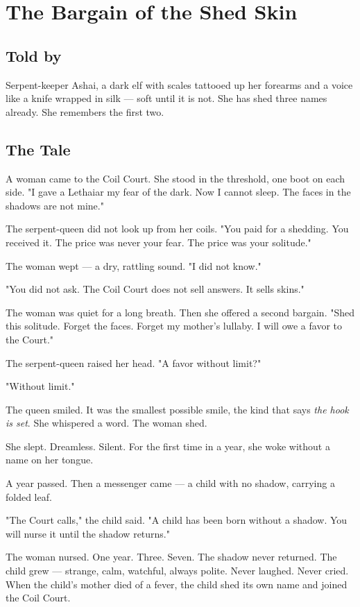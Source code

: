 \chapter{The Bargain of the Shed Skin}

\section*{Told by}
Serpent-keeper Ashai, a dark elf with scales tattooed up her forearms and a voice like a knife wrapped in silk — soft until it is not. She has shed three names already. She remembers the first two.

\section*{The Tale}

A woman came to the Coil Court. She stood in the threshold, one boot on each side. "I gave a Lethaiar my fear of the dark. Now I cannot sleep. The faces in the shadows are not mine."

The serpent-queen did not look up from her coils. "You paid for a shedding. You received it. The price was never your fear. The price was your solitude."

The woman wept — a dry, rattling sound. "I did not know."

"You did not ask. The Coil Court does not sell answers. It sells skins."

The woman was quiet for a long breath. Then she offered a second bargain. "Shed this solitude. Forget the faces. Forget my mother's lullaby. I will owe a favor to the Court."

The serpent-queen raised her head. "A favor without limit?"

"Without limit."

The queen smiled. It was the smallest possible smile, the kind that says \textit{the hook is set}. She whispered a word. The woman shed.

She slept. Dreamless. Silent. For the first time in a year, she woke without a name on her tongue.

A year passed. Then a messenger came — a child with no shadow, carrying a folded leaf.

"The Court calls," the child said. "A child has been born without a shadow. You will nurse it until the shadow returns."

The woman nursed. One year. Three. Seven. The shadow never returned. The child grew — strange, calm, watchful, always polite. Never laughed. Never cried. When the child's mother died of a fever, the child shed its own name and joined the Coil Court.

